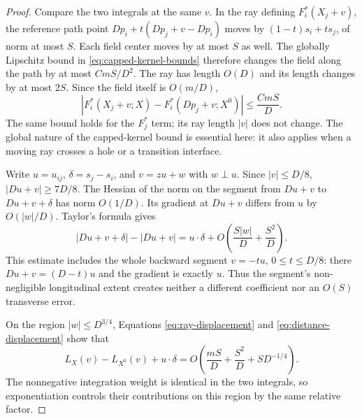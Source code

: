 \begin{proof}
Compare the two integrals at the same $v$.  In the ray defining
$F_i^*(X_j+v)$, the reference path point
$Dp_i+t(Dp_j+v-Dp_i)$ moves by $(1-t)s_i+ts_j$, of norm at
most $S$.  Each field center moves by at most $S$ as well.
The globally Lipschitz bound in \eqref{eq:capped-kernel-bounds}
therefore changes the field along the path by at most $CmS/D^2$.
The ray has length $O(D)$ and its length changes by at most $2S$.
Since the field itself is $O(m/D)$,
\begin{equation}
 |F_i^*(X_j+v;X)-F_i^*(Dp_j+v;X^0)|
    \le\frac{CmS}{D}.
 \label{eq:ray-displacement}
\end{equation}
The same bound holds for the $F_j^*$ term; its ray length $|v|$
does not change.  The global nature of the capped-kernel bound is
essential here: it also applies when a moving ray crosses a hole
or a transition interface.

Write $u=u_{ij}$, $\delta=s_j-s_i$, and $v=zu+w$ with
$w\perp u$.  Since $|v|\le D/8$,
$|Du+v|\ge7D/8$.  The Hessian of the norm on the segment from
$Du+v$ to $Du+v+\delta$ has norm $O(1/D)$.  Its gradient at
$Du+v$ differs from $u$ by $O(|w|/D)$.  Taylor's formula gives
\begin{equation}
 |Du+v+\delta|-|Du+v|
   =u\cdot\delta+O\left(\frac{S|w|}{D}+\frac{S^2}{D}\right).
 \label{eq:distance-displacement}
\end{equation}
This estimate includes the whole backward segment $v=-tu$,
$0\le t\le D/8$: there $Du+v=(D-t)u$ and the gradient is
exactly $u$.  Thus the segment's non-negligible longitudinal
extent creates neither a different coefficient nor an $O(S)$
transverse error.

On the region $|w|\le D^{3/4}$, Equations
\eqref{eq:ray-displacement} and \eqref{eq:distance-displacement}
show that
\begin{equation}
 L_X(v)-L_{X^0}(v)+u\cdot\delta
   =O\left(\frac{mS}{D}+\frac{S^2}{D}+S D^{-1/4}\right).
 \label{eq:main-region-log-error}
\end{equation}
The nonnegative integration weight is identical in the two
integrals, so exponentiation controls their contributions on
this region by the same relative factor.


\end{proof}

